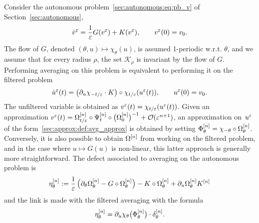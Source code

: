 Consider the autonomous problem~\eqref{sec:autonomous:eq:pb_v} of
Section~\ref{sec:autonomous}, 
\begin{equation*}
  \dot v^\varepsilon = \frac{1}{\varepsilon}G(v^\varepsilon) + K(v^\varepsilon),
  \qquad
  v^\varepsilon(0) = v_0 .
\end{equation*}
The flow of $G$, denoted $(\theta,u) \mapsto \chi_\theta(u)$, is assumed
1-periodic w.r.t. $\theta$, and we assume that for every radius $\rho$,
the set $\mathcal{K}_\rho$ is invariant by the flow of $G$. Performing
averaging on this problem is equivalent to performing it on the filtered
problem 
\begin{equation*}
  \dot u^\varepsilon(t) = \big( \partial_u \chi_{-t/\varepsilon} \cdot K \big) 
    \circ \chi_{t/\varepsilon} (u^\varepsilon(t)),
  \qquad
  u^\varepsilon(0) = v_0 .
\end{equation*}
The unfiltered variable is obtained as $v^\varepsilon(t) =
\chi_{t/\varepsilon}(u^\varepsilon(t) )$. Given an approximation $v^\varepsilon(t) = \Omega^{[n]} _{t/\varepsilon} \circ \Psi^{[n]} _t \circ \big( \Omega^{[n]} _0 \big)^{-1} +
\mathcal{O}(\varepsilon^{n+1} )$, an approximation on~$u^\varepsilon$ of the
form~\eqref{sec:approx:def:avg_approx} is obtained by setting $\Phi^{[n]}
_\theta = \chi_{-\theta} \circ \Omega^{[n]} _\theta$. Conversely, it is
also possible to obtain $\Omega^{[n]}$ from working on the filtered
problem, and in the case where $u \mapsto G(u)$ is non-linear, this latter
approach is generally more straightforward. The defect associated to 
averaging on the autonomous problem is 
\begin{equation} \label{sec:approx:def:eta}
  \eta^{[n]}_{\theta} 
  := \frac{1}{\varepsilon} \left( \partial_\theta \Omega^{[n]} _\theta 
  - G \circ \Omega^{[n]} _\theta \right) 
  - K \circ \Omega^{[n]} _\theta + \partial_u \Omega^{[n]} _\theta K^{[n]} 
\end{equation}
and the link is made with the filtered averaging with the formula 
\begin{equation*}
  \eta^{[n]} _\theta = \partial_u \chi _\theta \big( \Phi^{[n]} _\theta \big)
  \cdot \delta^{[n]} _\theta .
\end{equation*}



